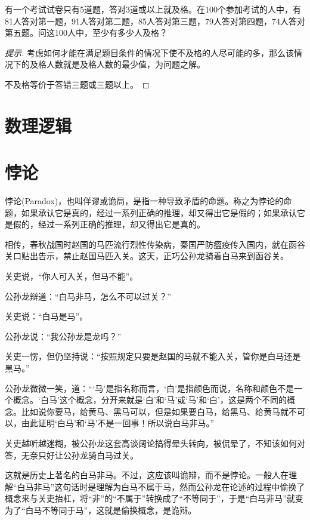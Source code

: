 \begin{example}
  有一个考试试卷只有5道题，答对3道或以上就及格。在100个参加考试的人中，有81人答对第一题，91人答对第二题，85人答对第三题，79人答对第四题，74人答对第五题。问这100人中，至少有多少人及格？
\end{example}
\begin{proof}[提示]
  考虑如何才能在满足题目条件的情况下使不及格的人尽可能的多，那么该情况下的及格人数就是及格人数的最少值，为问题之解。

  不及格等价于答错三题或三题以上。
\end{proof}

\section{数理逻辑}
\label{sec:mathematical-logic }

\section{悖论}
\label{sec:paradox}

悖论(Paradox)，也叫佯谬或诡局，是指一种导致矛盾的命题。称之为悖论的命题，如果承认它是真的，经过一系列正确的推理，却又得出它是假的；如果承认它是假的，经过一系列正确的推理，却又得出它是真的。

\begin{example}[白马非马]
  相传，春秋战国时赵国的马匹流行烈性传染病，秦国严防瘟疫传入国内，就在函谷关口贴出告示，禁止赵国马匹入关。这天，正巧公孙龙骑着白马来到函谷关。

关吏说，“你人可入关，但马不能”。

公孙龙辩道：“白马非马，怎么不可以过关？”

关吏说：“白马是马”。

公孙龙说：“我公孙龙是龙吗？”

关吏一愣，但仍坚持说：“按照规定只要是赵国的马就不能入关，管你是白马还是黑马。”

公孙龙微微一笑，道：“‘马’是指名称而言，‘白’是指颜色而说，名称和颜色不是一个概念。‘白马’这个概念，分开来就是‘白’和‘马’或‘马’和‘白’，这是两个不同的概念。比如说你要马，给黄马、黑马可以，但是如果要白马，给黑马、给黄马就不可以，由此证明‘白马’和‘马’不是一回事！所以说白马非马。”

关吏越听越迷糊，被公孙龙这套高谈阔论搞得晕头转向，被侃晕了，不知该如何对答，无奈只好让公孙龙骑白马过关。
\end{example}

这就是历史上著名的白马非马。不过，这应该叫诡辩，而不是悖论。一般人在理解“白马非马”这句话时是理解为白马不属于马，然而公孙龙在论述的过程中偷换了概念来与关吏抬杠，将“非”的“不属于”转换成了“不等同于”，于是“白马非马”就变为了“白马不等同于马”，这就是偷换概念，是诡辩。

